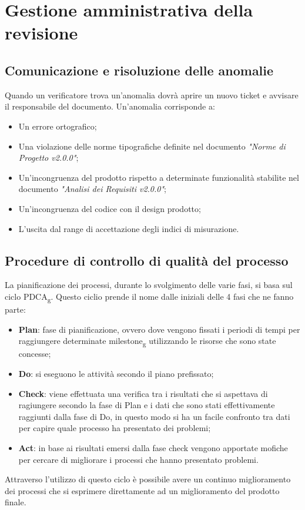 \documentclass[12pt,a4paper,titlepage]{article}
\begin{document}
	\newpage
	\section{Gestione amministrativa della revisione}
		\subsection{Comunicazione e risoluzione delle anomalie}
		Quando un verificatore trova un'anomalia dovrà aprire un nuovo ticket e avvisare il responsabile del documento. Un'anomalia corrisponde a:
		\begin{itemize}
			\item Un errore ortografico;
			\item Una violazione delle norme tipografiche definite nel documento \textit{"Norme di Progetto v2.0.0"}; 
			\item Un'incongruenza del prodotto rispetto a determinate funzionalità stabilite nel documento \textit{"Analisi dei Requisiti v2.0.0"};
			\item Un'incongruenza del codice con il design prodotto;
			\item L'uscita dal range di accettazione degli indici di misurazione.
		\end{itemize}
		
		\subsection{Procedure di controllo di qualità del processo}
		La pianificazione dei processi, durante lo svolgimento delle varie fasi, si basa sul ciclo PDCA\textsubscript{g}. Questo ciclio prende il nome dalle iniziali delle 4 fasi che ne fanno parte:
		\begin{itemize}
		    \item \textbf{Plan}: fase di pianificazione, ovvero dove vengono fissati i periodi di tempi per raggiungere determinate milestone\textsubscript{g} utilizzando le risorse che sono state concesse; 
		    \item \textbf{Do}: si eseguono le attività secondo il piano prefissato;
		    \item \textbf{Check}: viene effettuata una verifica tra i risultati che si aspettava di ragiungere secondo la fase di Plan e i dati che sono stati effettivamente raggiunti dalla fase di Do, in questo modo si ha un facile confronto tra dati per capire quale processo ha presentato dei problemi;
		    \item \textbf{Act}: in base ai risultati emersi dalla fase check vengono apportate mofiche per cercare di migliorare i processi che hanno presentato problemi.
		\end{itemize}
	    Attraverso l'utilizzo di questo ciclo è possibile avere un continuo miglioramento dei processi che si esprimere direttamente ad un miglioramento del prodotto finale.
	
\end{document}
